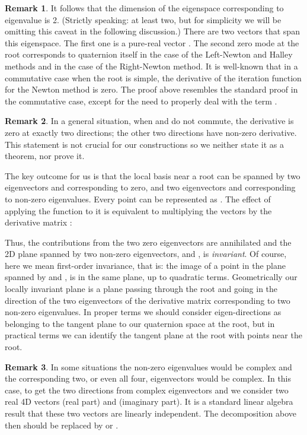 \documentclass{article}
\theoremstyle{definition}
\newtheorem{remark}{Remark}
\begin{document}
\begin{remark}
It follows that the dimension of the eigenspace corresponding to  eigenvalue is 2. (Strictly speaking: at least two, but for simplicity we will be omitting this caveat in the following discussion.) There are two vectors that span this eigenspace. The first one is a pure-real vector . The second zero mode at the root  corresponds to quaternion  itself in the case of the Left-Newton and Halley methods and  in the case of the Right-Newton method. It is well-known that in a commutative case when the root is simple, the derivative of the iteration function for the Newton method is zero. The proof above resembles the standard proof in the commutative case, except for the need to properly deal with the term .
\end{remark}

\begin{remark}
In a general situation, when  and  do not commute, the derivative is zero at exactly two directions; the other two directions have non-zero derivative. This statement is not crucial for our constructions so we neither state it as a theorem, nor prove it.

The key outcome for us is that the local basis near a root can be spanned by two eigenvectors  and  corresponding to zero, and two eigenvectors  and  corresponding to non-zero eigenvalues. Every point can be represented as . The effect of applying the function  to it is equivalent to multiplying the vectors by the derivative matrix :

Thus, the contributions from the two zero eigenvectors are annihilated and the 2D plane spanned by two non-zero eigenvectors,  and , is {\it invariant}. Of course, here we mean first-order invariance, that is: the image of a point in the plane spanned by  and , is in the same plane, up to quadratic terms. Geometrically our locally invariant plane is a plane passing through the root  and going in the direction of the two eigenvectors of the derivative matrix corresponding to two non-zero eigenvalues. In proper terms we should consider eigen-directions as belonging to the tangent plane to our quaternion space at the root, but in practical terms we can identify the tangent plane at the root with points near the root.
\end{remark}

\begin{remark}
In some situations the non-zero eigenvalues would be complex and the corresponding two, or even all four, eigenvectors would be complex. In this case, to get the two directions from complex eigenvectors  and  we consider two real 4D vectors  (real part) and  (imaginary part). It is a standard linear algebra result that these two vectors are linearly independent. The decomposition above then should be replaced by  or .
\end{remark}
\end{document}
